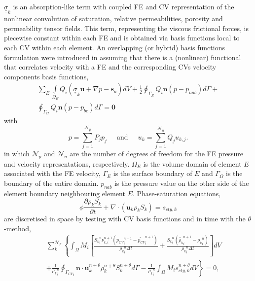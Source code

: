 \documentclass[preprint,authoryear,12pt]{elsarticle}
\begin{document}
$\underline{\underline{\sigma}}_{k}$ is an absorption-like term with coupled FE and CV representation of the nonlinear convolution of saturation, relative permeabilities, porosity and permeability tensor fields. This term, representing the viscous frictional forces, is piecewise constant within each FE and is obtained via basis functions local to each CV within each element. An overlapping (or hybrid) basis functions formulation were introduced in \citet{gomes_2013} assuming that there is a (nonlinear) functional that correlates velocity with a FE and the corresponding CVs velocity components basis functions,
\begin{eqnarray} 
 \sum\limits_{E} \left. \int\limits_{\Omega_E} { {Q}}_i \left({\underline {\underline \sigma}}_k  {\mathbf u} + \nabla p -{\mathbf s}_u \right) dV \right. +  \displaystyle\frac{1}{2} \oint_{\Gamma_{E}}  {Q}_i {\mathbf n} \left(p - p_{nab}\right) d\Gamma + \nonumber \\
 \oint_{\Gamma_{\Omega}} { Q}_i {\mathbf n} \left(p - p_{bc}\right) d\Gamma = \bm{0}
\label{force-semi-disc} 
\end{eqnarray} 
with
\begin{displaymath}
p = \sum\limits_{j=1}^{\mathcal{N}_p} P_{j}p_{j} \;\;\;\;\text{  and  }\;\;\;\; u_k=\sum\limits_{j=1}^{\mathcal{N}_u} Q_{j}u_{k,j}.
\end{displaymath} 
in which $\mathcal{N}_{p}$ and $\mathcal{N}_{u}$ are the number of degrees of freedom for the FE pressure and velocity representations, respectively. $\Omega_E$ is the volume domain of element $E$ associated with the FE velocity, $\Gamma_{E}$ is the surface boundary of $E$ and $\Gamma_{\Omega}$ is the boundary of the entire domain. $p_{nab}$ is the pressure value on the other side of the element boundary neighbouring element $E$.
Phase-saturation equations,
\begin{equation}\label{Eqn:Saturation}
  \phi\displaystyle\frac{\partial \rho_{k} S_{k} }{\partial t}  + \nabla \cdot \left( {\mathbf u}_{k} \rho_{k} S_{k}\right) = s_{cty,k} 
\end{equation}
are discretised in space by testing with CV basis functions and in time with the $\theta$-method,
\begin{eqnarray}
&&
\sum\limits_{k}^{\mathcal{N}_{p}} 
\left\{  
\int_{\Omega} M_{i} \left[  
\displaystyle\frac{ {S_{k}}_{i}^{n} {\nu_{k,i}^{n+1}} \left( {p_{CV}}_{i}^{n+1} - \tilde{p_{CV}}_i^{n+1} \right)} { {\rho_{k}}_{i}^{n} \Delta t } + \displaystyle\frac{ {S_{k}}_{i}^{n} \left( \tilde{ {\rho}_{k}}_{i}^{n+1} - {\rho_{k}}_{i}^{n} \right) } { { \rho_{k}}_{i}^{n} \Delta t }
\right] dV \right. \nonumber \\
&&
\left. 
 + \displaystyle\frac{1}{ {\rho_{k}}_{i}^{n} } \oint_{ {\Gamma_{CV}}_{i}} \mathbf{n} \cdot \mathbf{u}_{k}^{n+\theta} \rho_{k}^{n+\theta} S_{k}^{n+\theta} d\Gamma -\displaystyle\frac{1}{ {\rho_{k}}_{i}^{n} } \int_{\Omega} M_{i} s_{cty,k}^{n+\theta} dV
\right\} = 0,
  \label{detail-global-cty}
\end{eqnarray}
\end{document}

